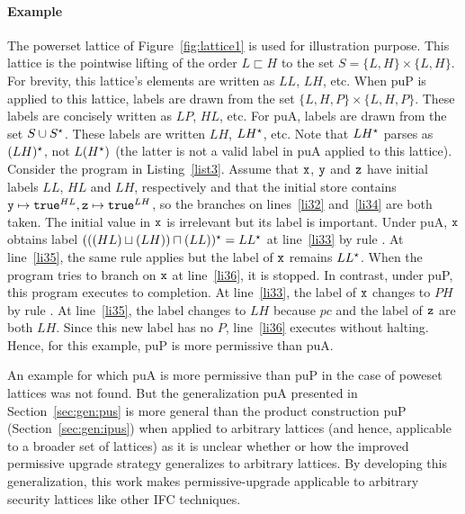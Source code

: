 \paragraph{Example}
The powerset lattice of Figure~\ref{fig:lattice1} is used for
illustration purpose. This lattice is the pointwise lifting of the order $L
\sqsubset H$ to the set $S = \{L, H\} \times \{L, H\}$. For brevity,
this lattice's elements are written as $LL$, $LH$, etc. When puP is
applied to this lattice, labels are drawn from the set $\{L, H, P\}
\times \{L, H, P\}$. These labels are concisely written as $LP$, $HL$,
etc. For puA, labels are drawn from the set $S \cup S{}^\star$. These
labels are written $LH$, $LH{}^\star$, etc. Note that $LH{}^\star$ parses as
$(LH){}^\star$, not $L(H{}^\star)$ (the latter is not a valid label in puA
applied to this lattice).
%
Consider the program in Listing~\ref{list3}. Assume that $\texttt{x}$,
$\texttt{y}$ and $\texttt{z}$ have 
initial labels $LL$, $HL$ and $LH$, respectively and that the initial
store contains $\texttt{y} \mapsto \texttt{true}^{HL}, \texttt{z} \mapsto
\texttt{true}^{LH}$, so the branches on lines~\ref{li32}
and~\ref{li34} are both taken. The initial value in $\texttt{x}$ is irrelevant
but its label is important.
Under puA, $\texttt{x}$ obtains label $(((HL) \sqcup (LH)) \sqcap (LL)){}^\star = LL{}^\star$ at
line~\ref{li33} by rule . At line~\ref{li35}, the same rule
applies but the label of $\texttt{x}$ remains $LL{}^\star$. When the program tries
to branch on $\texttt{x}$ at line~\ref{li36}, it is stopped.
In contrast, under puP, this program executes to completion. At
line~\ref{li33}, the label of $\texttt{x}$ changes to $PH$ by rule
. At line~\ref{li35}, the label changes to $LH$ because $pc$
and the label of $\texttt{z}$ are both $LH$. Since this new label has no $P$,
line~\ref{li36} executes without halting.
Hence, for this example, puP is more permissive than puA.

An example for which  puA is more permissive than puP in the case of
poweset lattices was not found. But the generalization puA presented in
Section~\ref{sec:gen:pus} is more general than the product
construction puP (Section~\ref{sec:gen:ipus}) when applied to arbitrary
lattices (and hence, applicable to a broader set of lattices) as it is
unclear whether or how  the improved permissive 
upgrade strategy generalizes to arbitrary lattices. By developing this
generalization, this work makes permissive-upgrade applicable to
arbitrary security lattices like other IFC techniques.

